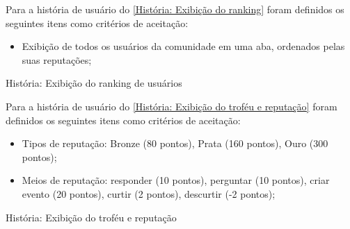 Para a história de usuário do \autoref{História: Exibição do ranking} foram definidos os seguintes itens como critérios de aceitação:

\begin{itemize}
\item Exibição de todos os usuários da comunidade em uma aba, ordenados pelas suas reputações;
\end{itemize}

\def\arraystretch{2}
\begin{quadro}[htb]
\centering
\ABNTEXfontereduzida
\caption[História: Exibição do ranking de usuários]{História: Exibição do ranking de usuários}
\label{História: Exibição do ranking}
\end{quadro}
\FloatBarrier 

Para a história de usuário do \autoref{História: Exibição do troféu e reputação} foram definidos os seguintes itens como critérios de aceitação:

\begin{itemize}
\item Tipos de reputação: Bronze (80 pontos), Prata (160 pontos), Ouro (300 pontos); 
\item Meios de reputação: responder (10 pontos), perguntar (10 pontos), criar evento (20 pontos), curtir (2 pontos), descurtir (-2 pontos);
\end{itemize}

\def\arraystretch{2}
\begin{quadro}[htb]
\centering
\ABNTEXfontereduzida
\caption[História: Exibição do troféu e reputação]{História: Exibição do troféu e reputação}
\label{História: Exibição do troféu e reputação}
\end{quadro}
\FloatBarrier 

